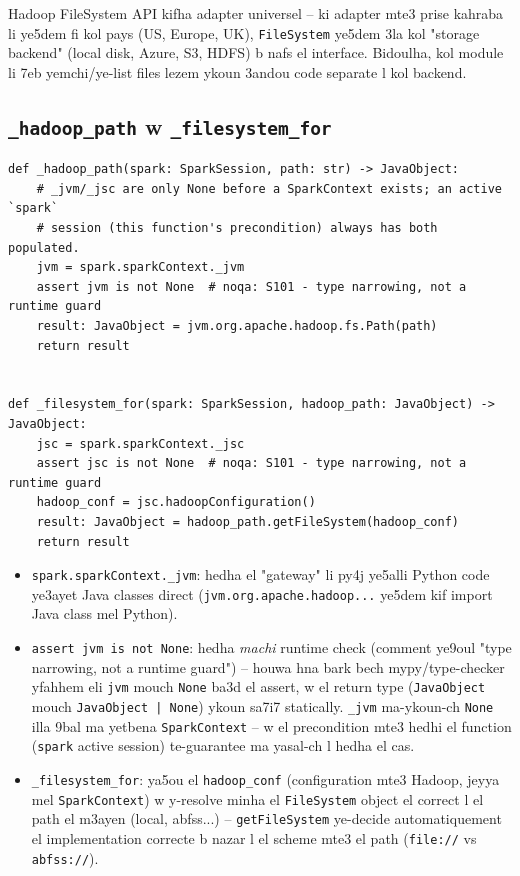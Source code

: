 \documentclass[11pt,a4paper]{report}
\DeclareRobustCommand{\code}[1]{\texttt{#1}}
\begin{document}
\begin{analogy}
Hadoop FileSystem API kifha adapter universel -- ki adapter mte3 prise
kahraba li ye5dem fi kol pays (US, Europe, UK), \code{FileSystem} ye5dem 3la
kol "storage backend" (local disk, Azure, S3, HDFS) b nafs el interface.
Bidoulha, kol module li 7eb yemchi/ye-list files lezem ykoun 3andou code
separate l kol backend.
\end{analogy}

\subsection{\code{\_hadoop\_path} w \code{\_filesystem\_for}}

\begin{lstlisting}[style=pystyle]
def _hadoop_path(spark: SparkSession, path: str) -> JavaObject:
    # _jvm/_jsc are only None before a SparkContext exists; an active `spark`
    # session (this function's precondition) always has both populated.
    jvm = spark.sparkContext._jvm
    assert jvm is not None  # noqa: S101 - type narrowing, not a runtime guard
    result: JavaObject = jvm.org.apache.hadoop.fs.Path(path)
    return result


def _filesystem_for(spark: SparkSession, hadoop_path: JavaObject) -> JavaObject:
    jsc = spark.sparkContext._jsc
    assert jsc is not None  # noqa: S101 - type narrowing, not a runtime guard
    hadoop_conf = jsc.hadoopConfiguration()
    result: JavaObject = hadoop_path.getFileSystem(hadoop_conf)
    return result
\end{lstlisting}

\begin{itemize}
  \item \code{spark.sparkContext.\_jvm}: hedha el "gateway" li py4j ye5alli
        Python code ye3ayet Java classes direct (\code{jvm.org.apache.hadoop...}
        ye5dem kif import Java class mel Python).
  \item \code{assert jvm is not None}: hedha \emph{machi} runtime check
        (comment ye9oul "type narrowing, not a runtime guard") -- houwa hna
        bark bech mypy/type-checker yfahhem eli \code{jvm} mouch \code{None}
        ba3d el assert, w el return type (\code{JavaObject} mouch
        \code{JavaObject | None}) ykoun sa7i7 statically. \code{\_jvm} ma-ykoun-ch
        \code{None} illa 9bal ma yetbena \code{SparkContext} -- w el precondition
        mte3 hedhi el function (\code{spark} active session) te-guarantee ma
        yasal-ch l hedha el cas.
  \item \code{\_filesystem\_for}: ya5ou el \code{hadoop\_conf} (configuration
        mte3 Hadoop, jeyya mel \code{SparkContext}) w y-resolve minha el
        \code{FileSystem} object el correct l el path el m3ayen (local, abfss...)
        -- \code{getFileSystem} ye-decide automatiquement el implementation
        correcte b nazar l el scheme mte3 el path (\code{file://} vs
        \code{abfss://}).
\end{itemize}
\end{document}
